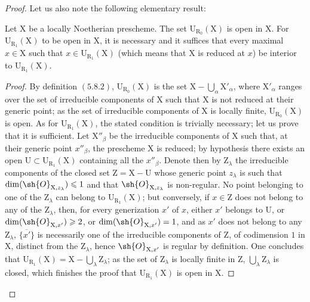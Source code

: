 \begin{proof}
Let us also note the following elementary result:

\begin{proposition}[6.12.10]
\label{IV.6.12.10}
Let $\mathrm{X}$ be a locally Noetherian prescheme. The set $\mathrm{U}_{\mathrm{R}_0}(\mathrm{X})$ is
open in $\mathrm{X}$. For $\mathrm{U}_{\mathrm{R}_1}(\mathrm{X})$ to be open in $\mathrm{X}$, it is necessary and it suffices that every maximal $x\in\mathrm{X}$
such that $x\in\mathrm{U}_{\mathrm{R}_1}(\mathrm{X})$ (which means that $\mathrm{X}$ is reduced at $x$) be interior to $\mathrm{U}_{\mathrm{R}_1}(\mathrm{X})$.
\end{proposition}

\begin{proof}
By definition $(5.8.2)$, $\mathrm{U}_{\mathrm{R}_0}(\mathrm{X})$ is the set $\mathrm{X}-\bigcup_\alpha\mathrm{X}'_\alpha$, where $\mathrm{X}'_\alpha$ ranges over the set of
irreducible components of $\mathrm{X}$ such that $\mathrm{X}$ is not reduced at their generic point;
as the set of irreducible components of $\mathrm{X}$ is locally finite, $\mathrm{U}_{\mathrm{R}_0}(\mathrm{X})$ is
open. As for $\mathrm{U}_{\mathrm{R}_1}(\mathrm{X})$, the stated condition is trivially necessary;
let us prove that it is sufficient. Let $\mathrm{X}''_\beta$ be the irreducible components of $\mathrm{X}$ such that,
at their generic point $x''_\beta$, the prescheme $\mathrm{X}$ is reduced; by hypothesis there exists an open
$\mathrm{U}\subset\mathrm{U}_{\mathrm{R}_1}(\mathrm{X})$ containing all the $x''_\beta$. Denote then by $\mathrm{Z}_\lambda$ the irreducible components
of the closed set $\mathrm{Z}=\mathrm{X}-\mathrm{U}$ whose generic point $z_\lambda$ is such that $\dim(\sh{O}_{\mathrm{X},z_\lambda})\leqslant 1$
and that $\sh{O}_{\mathrm{X},z_\lambda}$ is non-regular. No point belonging to one of the $\mathrm{Z}_\lambda$ can belong
to $\mathrm{U}_{\mathrm{R}_1}(\mathrm{X})$; but conversely, if $x\in\mathrm{Z}$ does not belong to any of the $\mathrm{Z}_\lambda$, then, for every
generization $x'$ of $x$, either $x'$ belongs to $\mathrm{U}$, or
$\dim(\sh{O}_{\mathrm{X},x'})\geqslant 2$, or
$\dim(\sh{O}_{\mathrm{X},x'})=1$, and as $x'$ does not belong to any $\mathrm{Z}_\lambda$, $\overline{\{x'\}}$ is necessarily
one of the irreducible components of $\mathrm{Z}$, of codimension $1$ in $\mathrm{X}$, distinct from the $\mathrm{Z}_\lambda$, hence $\sh{O}_{\mathrm{X},x'}$
is regular by definition. One concludes that $\mathrm{U}_{\mathrm{R}_1}(\mathrm{X})=\mathrm{X}-\bigcup_\lambda\mathrm{Z}_\lambda$; as the set of
$\mathrm{Z}_\lambda$ is locally finite in $\mathrm{Z}$, $\bigcup_\lambda\mathrm{Z}_\lambda$ is closed, which finishes the proof that $\mathrm{U}_{\mathrm{R}_1}(\mathrm{X})$
is open in $\mathrm{X}$.
\end{proof}


\end{proof}
